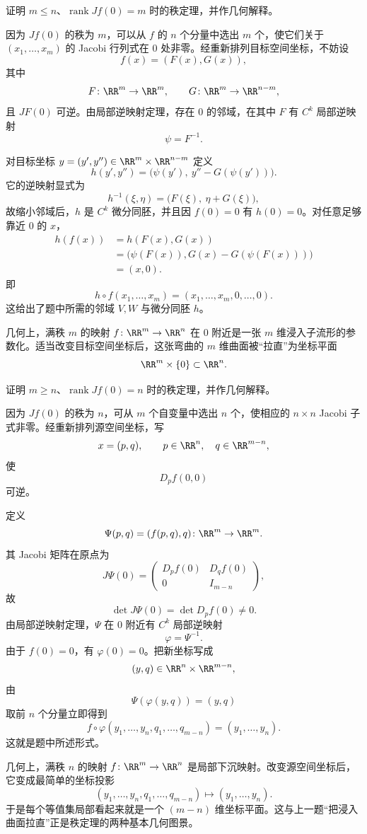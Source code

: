 \begin{xreferenceproblem}[20.5.2 第二组参考题 5]
证明 $m\le n$、$\operatorname{rank}Jf(0)=m$ 时的秩定理，并作几何解释。
\end{xreferenceproblem}
\begin{xsolution}
因为 $Jf(0)$ 的秩为 $m$，可以从 $f$ 的 $n$ 个分量中选出 $m$ 个，使它们关于 $(x_1,\ldots,x_m)$ 的 Jacobi 行列式在 $0$ 处非零。经重新排列目标空间坐标，不妨设
\[
  f(x)=(F(x),G(x)),
\]
其中
\[
  F\colon\RR^m\to\RR^m,
  \qquad
  G\colon\RR^m\to\RR^{n-m},
\]
且 $JF(0)$ 可逆。由局部逆映射定理，存在 $0$ 的邻域，在其中 $F$ 有 $C^k$ 局部逆映射
\[
  \psi=F^{-1}.
\]

对目标坐标 $y=(y',y'')\in\RR^m\times\RR^{n-m}$ 定义
\[
  h(y',y'')
  =\bigl(\psi(y'),\ y''-G(\psi(y'))\bigr).
\]
它的逆映射显式为
\[
  h^{-1}(\xi,\eta)
  =\bigl(F(\xi),\ \eta+G(\xi)\bigr),
\]
故缩小邻域后，$h$ 是 $C^k$ 微分同胚，并且因 $f(0)=0$ 有 $h(0)=0$。对任意足够靠近 $0$ 的 $x$，
\begin{align*}
  h(f(x))
  &=h(F(x),G(x))\\
  &=\bigl(\psi(F(x)),G(x)-G(\psi(F(x)))\bigr)\\
  &=(x,0).
\end{align*}
即
\[
  \boxed{\displaystyle
    h\circ f(x_1,\ldots,x_m)
    =(x_1,\ldots,x_m,0,\ldots,0)}.
\]
这给出了题中所需的邻域 $V,W$ 与微分同胚 $h$。

几何上，满秩 $m$ 的映射 $f\colon\RR^m\to\RR^n$ 在 $0$ 附近是一张 $m$ 维浸入子流形的参数化。适当改变目标空间坐标后，这张弯曲的 $m$ 维曲面被“拉直”为坐标平面
\[
  \RR^m\times\{0\}\subset\RR^n.
\]
\end{xsolution}

\begin{xreferenceproblem}[20.5.2 第二组参考题 6]
证明 $m\ge n$、$\operatorname{rank}Jf(0)=n$ 时的秩定理，并作几何解释。
\end{xreferenceproblem}
\begin{xsolution}
因为 $Jf(0)$ 的秩为 $n$，可从 $m$ 个自变量中选出 $n$ 个，使相应的 $n\times n$ Jacobi 子式非零。经重新排列源空间坐标，写
\[
  x=(p,q),
  \qquad p\in\RR^n,
  \quad q\in\RR^{m-n},
\]
使
\[
  D_pf(0,0)
\]
可逆。

定义
\[
  \Psi(p,q)=(f(p,q),q)
  \colon\RR^m\to\RR^m.
\]
其 Jacobi 矩阵在原点为
\[
  J\Psi(0)=
  \begin{pmatrix}
    D_pf(0)&D_qf(0)\\
    0&I_{m-n}
  \end{pmatrix},
\]
故
\[
  \det J\Psi(0)=\det D_pf(0)\ne0.
\]
由局部逆映射定理，$\Psi$ 在 $0$ 附近有 $C^k$ 局部逆映射
\[
  \varphi=\Psi^{-1}.
\]
由于 $f(0)=0$，有 $\varphi(0)=0$。把新坐标写成
\[
  (y,q)\in\RR^n\times\RR^{m-n},
\]
由
\[
  \Psi(\varphi(y,q))=(y,q)
\]
取前 $n$ 个分量立即得到
\[
  \boxed{\displaystyle
    f\circ\varphi(y_1,\ldots,y_n,q_1,\ldots,q_{m-n})
    =(y_1,\ldots,y_n)}.
\]
这就是题中所述形式。

几何上，满秩 $n$ 的映射 $f\colon\RR^m\to\RR^n$ 是局部下沉映射。改变源空间坐标后，它变成最简单的坐标投影
\[
  (y_1,\ldots,y_n,q_1,\ldots,q_{m-n})
  \longmapsto(y_1,\ldots,y_n).
\]
于是每个等值集局部看起来就是一个 $(m-n)$ 维坐标平面。这与上一题“把浸入曲面拉直”正是秩定理的两种基本几何图景。
\end{xsolution}
